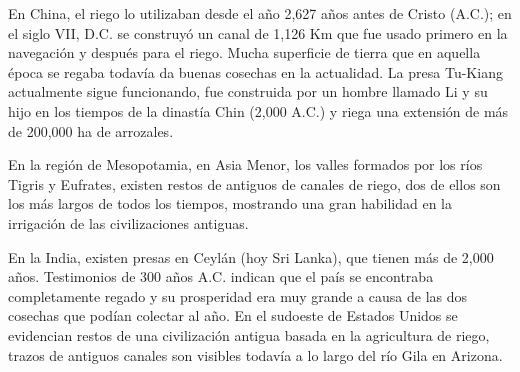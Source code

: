 En China, el riego lo utilizaban desde el año 2,627 años antes de Cristo (A.C.); en el siglo VII, D.C. se construyó un canal de 1,126 Km que fue usado primero en la navegación y después para el riego. Mucha superficie de tierra que en aquella época se regaba todavía da buenas cosechas en la actualidad. La presa Tu-Kiang actualmente sigue funcionando, fue construida por un hombre llamado Li y su hijo en los tiempos de la dinastía Chin (2,000 A.C.) y riega una extensión de más de 200,000 ha de arrozales.

En la región de Mesopotamia, en Asia Menor, los valles formados por los ríos Tigris y Eufrates, existen restos de antiguos de canales de riego, dos de ellos son los más largos de todos los tiempos, mostrando una gran habilidad en la irrigación de las civilizaciones antiguas.

En la India, existen presas en Ceylán (hoy Sri Lanka), que tienen más de 2,000 años. Testimonios de 300 años A.C. indican que el país se encontraba completamente regado y su prosperidad era muy grande a causa de las dos cosechas que podían colectar al año. En el sudoeste de Estados Unidos se evidencian restos de una civilización antigua basada en la agricultura de riego, trazos de antiguos canales son visibles todavía a lo largo del río Gila en Arizona.
